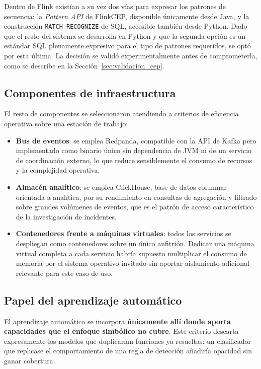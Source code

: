 Dentro de Flink existían a su vez dos vías para expresar los patrones de secuencia: la
\textit{Pattern API} de FlinkCEP, disponible únicamente desde Java, y la construcción
\texttt{MATCH\_RECOGNIZE} de SQL, accesible también desde Python. Dado que el resto del
sistema se desarrolla en Python y que la segunda opción es un estándar SQL plenamente
expresivo para el tipo de patrones requeridos, se optó por esta última. La decisión se
validó experimentalmente antes de comprometerla, como se describe en la
Sección~\ref{sec:validacion_cep}.

\subsection{Componentes de infraestructura}

El resto de componentes se seleccionaron atendiendo a criterios de eficiencia operativa
sobre una estación de trabajo:

\begin{itemize}
    \item \textbf{Bus de eventos}: se emplea Redpanda, compatible con la API de Kafka pero
    implementado como binario único sin dependencia de JVM ni de un servicio de coordinación
    externo, lo que reduce sensiblemente el consumo de recursos y la complejidad operativa.
    \item \textbf{Almacén analítico}: se emplea ClickHouse, base de datos columnar orientada
    a analítica, por su rendimiento en consultas de agregación y filtrado sobre grandes
    volúmenes de eventos, que es el patrón de acceso característico de la investigación de
    incidentes.
    \item \textbf{Contenedores frente a máquinas virtuales}: todos los servicios se despliegan
    como contenedores sobre un único anfitrión. Dedicar una máquina virtual completa a cada
    servicio habría supuesto multiplicar el consumo de memoria por el sistema operativo
    invitado sin aportar aislamiento adicional relevante para este caso de uso.
\end{itemize}

\subsection{Papel del aprendizaje automático}

El aprendizaje automático se incorpora \textbf{únicamente allí donde aporta capacidades que
el enfoque simbólico no cubre}. Este criterio descarta expresamente los modelos que
duplicarían funciones ya resueltas: un clasificador que replicase el comportamiento de una
regla de detección añadiría opacidad sin ganar cobertura.

